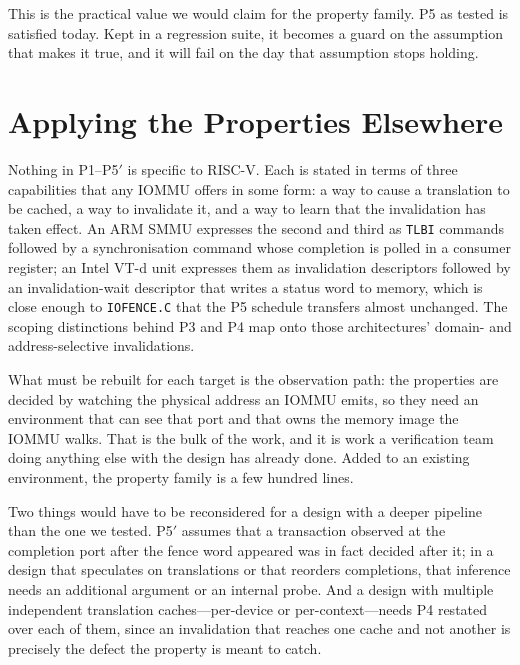 \documentclass[journal]{IEEEtran}
\newcommand{\cmd}[1]{\mbox{\texttt{#1}}}
\begin{document}
This is the practical value we would claim for the property family. P5 as tested
is satisfied today. Kept in a regression suite, it becomes a guard on the
assumption that makes it true, and it will fail on the day that assumption stops
holding.

\section{Applying the Properties Elsewhere}
Nothing in P1--P5$'$ is specific to RISC-V. Each is stated in terms of three
capabilities that any IOMMU offers in some form: a way to cause a translation to
be cached, a way to invalidate it, and a way to learn that the invalidation has
taken effect. An ARM SMMU expresses the second and third as \texttt{TLBI}
commands followed by a synchronisation command whose completion is polled in a
consumer register; an Intel VT-d unit expresses them as invalidation descriptors
followed by an invalidation-wait descriptor that writes a status word to memory,
which is close enough to \cmd{IOFENCE.C} that the P5 schedule transfers
almost unchanged. The scoping distinctions behind P3 and P4 map onto those
architectures' domain- and address-selective invalidations.

What must be rebuilt for each target is the observation path: the properties are
decided by watching the physical address an IOMMU emits, so they need an
environment that can see that port and that owns the memory image the IOMMU
walks. That is the bulk of the work, and it is work a verification team doing
anything else with the design has already done. Added to an existing
environment, the property family is a few hundred lines.

Two things would have to be reconsidered for a design with a deeper pipeline
than the one we tested. P5$'$ assumes that a transaction observed at the
completion port after the fence word appeared was in fact decided after it;
in a design that speculates on translations or that reorders completions, that
inference needs an additional argument or an internal probe. And a design with
multiple independent translation caches---per-device or per-context---needs P4
restated over each of them, since an invalidation that reaches one cache and not
another is precisely the defect the property is meant to catch.
\end{document}
